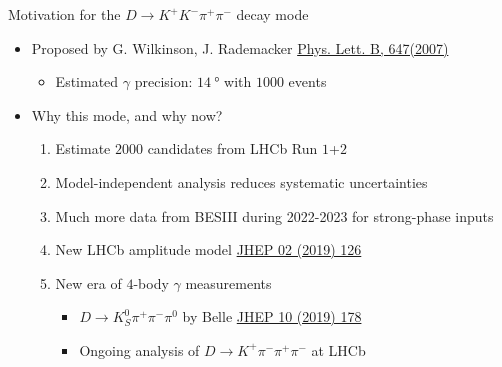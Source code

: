 \documentclass{beamer}
\begin{document}
\begin{frame}{Motivation for the $D\to K^+K^-\pi^+\pi^-$ decay mode}
  \begin{itemize}
    \setlength\itemsep{1.3em}
    \item{Proposed by G. Wilkinson, J. Rademacker \href{https://arxiv.org/abs/hep-ph/0611272}{Phys. Lett. B, 647(2007)}}
    \begin{itemize}
      \item{Estimated $\gamma$ precision: $\SI{14}{\degree}$ with $1000$ events}
    \end{itemize}
    \item{Why this mode, and why now?}
    \begin{enumerate}
      \setlength\itemsep{1.0em}
      \item{Estimate $2000$ candidates from LHCb Run $1$+$2$}
      \item{Model-independent analysis reduces systematic uncertainties}
      \item{Much more data from BESIII during 2022-2023 for strong-phase inputs}
      \item{New LHCb amplitude model \href{https://arxiv.org/abs/1811.08304}{JHEP 02 (2019) 126}}
      \item{New era of $4$-body $\gamma$ measurements}
      \begin{itemize}
        \item{$D\to K_S^0\pi^+\pi^-\pi^0$ by Belle \href{https://arxiv.org/abs/1908.09499}{JHEP 10 (2019) 178}}
        \item{Ongoing analysis of $D\to K^+\pi^-\pi^+\pi^-$ at LHCb}
      \end{itemize}
    \end{enumerate}
  \end{itemize}
\end{frame}
\end{document}
